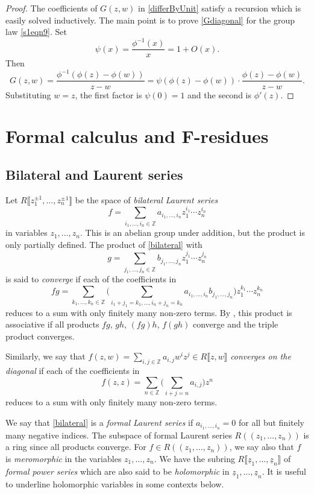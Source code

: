 \documentclass[10pt,a4paper]{amsart}
\numberwithin{equation}{section}
\theoremstyle{definition}
\def\lb{\llbracket}
\def\rb{\rrbracket}
\begin{document}
\begin{proof}
 The coefficients of $G(z,w)$ in \eqref{differByUnit} satisfy a recursion which is easily solved inductively. The main point is to prove \eqref{Gdiagonal} for the group law \eqref{s1eqn9}. Set
 \[
 \psi(x)=\frac{\phi^{-1}(x)}{x}=1+O(x).
 \]
 Then
 \[
 G(z,w)=\frac{\phi^{-1}(\phi(z)-\phi(w))}{z-w}=\psi(\phi(z)-\phi(w))\cdot \frac{\phi(z)-\phi(w)}{z-w}.
 \]
 Substituting $w=z$, the first factor is $\psi(0)=1$ and the second is $\phi'(z)$.
\end{proof}

\section[Formal calculus and F-residues]{Formal calculus and $\boldsymbol{F}$-residues}
\label{s3}

\subsection{Bilateral and Laurent series}
\label{s31}

Let $R\big\lb z_1^{\pm1},\dots,z_n^{\pm1}\big\rb$ be the space of \emph{bilateral Laurent series}
\begin{equation}
\label{bilateral}
 f=\sum_{i_1,\dots,i_n\in\mathbb{Z}} a_{i_1,\dots,i_n} z_1^{i_1}\cdots z_n^{i_n}
\end{equation}
in variables $z_1, \dots, z_n$. This is an abelian group under addition, but the product is only partially defined. The product of \eqref{bilateral} with
\[
 g=\sum_{j_1,\dots,j_n\in\mathbb{Z}} b_{j_1,\dots,j_n} z_1^{j_1}\cdots z_n^{j_n}
\]
is said to \emph{converge} if each of the coefficients in
\[
 fg = \sum_{k_1,\dots,k_n\in\mathbb{Z}} \Biggl(\sum_{i_1+j_1=k_1,\dots, i_n+j_n=k_n}a_{i_1,\dots,i_n}b_{j_1,\dots,j_n}\Biggr)z_1^{k_1}\cdots z_n^{k_n}
\]
reduces to a sum with only finitely many non-zero terms. By \cite[p.\ 24]{LL}, this product is associative if all products $fg$, $gh$, $(fg)h$, $f(gh)$ converge and the triple product converges.

Similarly, we say that $f(z,w)=\sum_{i,j\in\mathbb{Z}} a_{i,j}w^iz^j\in R\lb z,w\rb$ \emph{converges on the diagonal} if each of the coefficients in
\[
 f(z,z)=\sum_{n\in\mathbb{Z}} \Biggl(\sum_{i+j=n} a_{i,j}\Biggr)z^n
\]
reduces to a sum with only finitely many non-zero terms.

We say that \eqref{bilateral} is a \emph{formal Laurent series} if $a_{i_1,\dots, i_n}=0$ for all but finitely many negative indices. The subspace of formal Laurent series
$
 R(\!( z_1,\dots,z_n)\!)
$
is a ring since all products converge. For $f\in R(\!( z_1,\dots,z_n)\!) $, we say also that $f$ is \emph{meromorphic} in the variables $z_1,\dots, z_n$. We have the subring
$
 R\lb \underline{z}_1,\dots,\underline{z}_n\rb
$
of \emph{formal power series} which are also said to be \emph{holomorphic} in $\underline{z}_1,\dots, \underline{z}_n$. It is useful to underline holomorphic variables in some contexts below.
\end{document}
